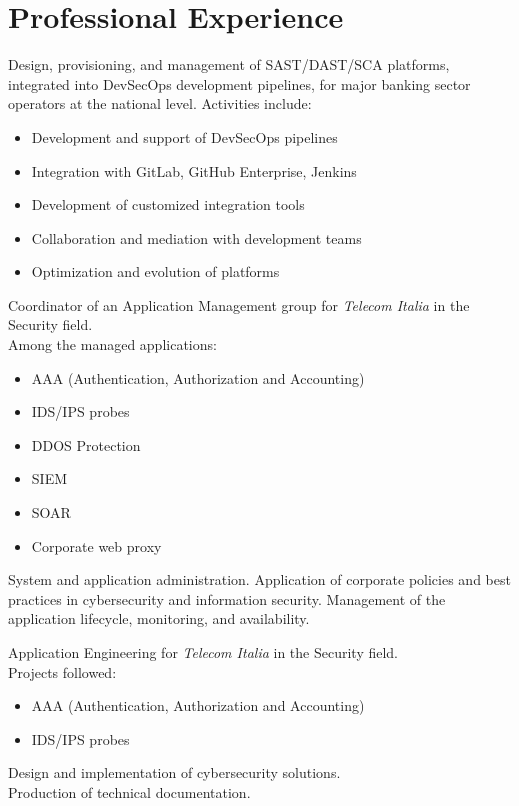 \section{Professional Experience}
        {Design, provisioning, and management of SAST/DAST/SCA platforms, integrated into DevSecOps development pipelines, for major banking sector operators at the national level. Activities include:
          \begin{itemize}
          \item Development and support of DevSecOps pipelines
          \item Integration with GitLab, GitHub Enterprise, Jenkins
          \item Development of customized integration tools
          \item Collaboration and mediation with development teams
          \item Optimization and evolution of platforms
        \end{itemize}}
\vspace{3mm}
        {Coordinator of an Application Management group for \emph{Telecom Italia} in the Security field.\\ Among the managed applications: \begin{itemize}
          \item AAA (Authentication, Authorization and Accounting)
          \item IDS/IPS probes
          \item DDOS Protection
          \item SIEM
          \item SOAR
          \item Corporate web proxy
          \end{itemize}
          System and application administration. Application of corporate policies and best practices in cybersecurity and information security. Management of the application lifecycle, monitoring, and availability.}
\vspace{3mm}
        {Application Engineering for \emph{Telecom Italia} in the Security field. \\ Projects followed:
          \begin{itemize}
          \item AAA (Authentication, Authorization and Accounting)
          \item IDS/IPS probes
        \end{itemize}
          Design and implementation of cybersecurity solutions.\\
          Production of technical documentation.}
